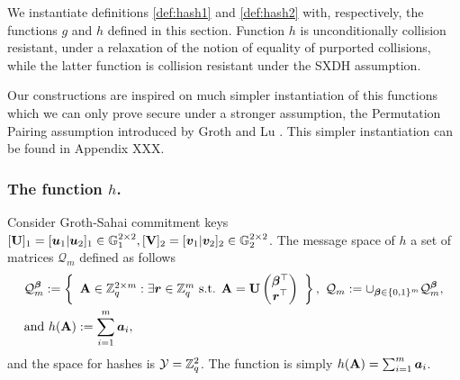 
We instantiate definitions \ref{def:hash1} and \ref{def:hash2}  with, respectively, the functions $g$ and $h$ defined in this section. Function $h$ is unconditionally collision resistant, under a relaxation of the notion of equality of purported collisions, while the latter function is collision resistant under the SXDH assumption.


Our constructions are inspired on much simpler instantiation of this functions which we can only prove secure under a stronger assumption, the Permutation Pairing assumption introduced by Groth and Lu \cite{AC:GroLu07}. This simpler instantiation can be found in Appendix XXX. 

\subsubsection{The function $h$.} Consider Groth-Sahai commitment keys  $[\mathbf{{U}}]_1 = [{\boldsymbol{u}}_1|{\boldsymbol{u}}_2]_1\in\mathbb{G}_1^{2\times 2},[\mathbf{{V}}]_2=[{\boldsymbol{v}}_1|{\boldsymbol{v}}_2]_2\in\mathbb{G}_2^{2\times 2}$. The message space of $h$ a set of matrices $\mathcal{Q}_m$ defined as follows
\begin{align*}
&\mathcal{Q}_m^{\boldsymbol{\beta}} := \left\{
\begin{array}{c}
\mathbf{{A}} \in \mathbb{Z}_q^{2\times m}:
\exists {\boldsymbol{r}}\in\mathbb{Z}_q^m\text{ s.t. }
{\mathbf{{A}} = \mathbf{{U}}\left(\begin{matrix}{\boldsymbol{\beta}}^\top\\{\boldsymbol{r}}^\top\end{matrix}\right)
}
\end{array}\right\},
\ \mathcal{Q}_m := \cup_{{\boldsymbol{\beta}}\in\{0,1\}^m} \mathcal{Q}_m^{\boldsymbol{\beta}},\\
&\text{and } h(\mathbf{{A}}):= \sum_{i=1}^m{\boldsymbol{a}}_i,
\end{align*}
and the space for hashes is $\mathcal{Y}=\mathbb{Z}_q^2$. The function is simply $h(\mathbf{{A}})=\sum_{i=1}^m {\boldsymbol{a}}_i$.

